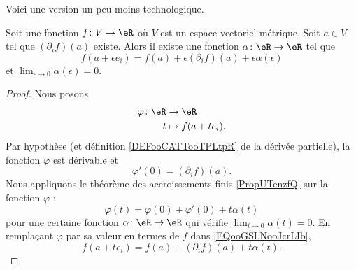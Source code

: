 Voici une version un peu moins technologique.
\begin{proposition}     \label{PROPooYYSMooUDxtlB}
	Soit une fonction \( f\colon V\to \eR\) où \( V\) est un espace vectoriel métrique. Soit \( a\in V\) tel que \( (\partial_if)(a)\) existe. Alors il existe une fonction \( \alpha\colon \eR\to \eR\) tel que
	\begin{equation}
		f(a+\epsilon e_i)=f(a)+\epsilon(\partial_if)(a)+\epsilon\alpha(\epsilon)
	\end{equation}
	et \( \lim_{\epsilon\to 0}\alpha(\epsilon)=0\).
\end{proposition}

\begin{proof}
	Nous posons
	\begin{equation}
		\begin{aligned}
			\varphi\colon \eR & \to \eR             \\
			t                 & \mapsto f(a+ te_i).
		\end{aligned}
	\end{equation}
	Par hypothèse (et définition \ref{DEFooCATTooTPLtpR} de la dérivée partielle), la fonction \( \varphi\) est dérivable et
	\begin{equation}
		\varphi'(0)=(\partial_if)(a).
	\end{equation}
	Nous appliquons le théorème des accroissements finis \ref{PropUTenzfQ} sur la fonction \( \varphi\) :
	\begin{equation}        \label{EQooGSLNooJcrLIb}
		\varphi(t)=\varphi(0)+\varphi'(0)+t\alpha(t)
	\end{equation}
	pour une certaine fonction \( \alpha\colon \eR\to \eR\) qui vérifie \( \lim_{t\to 0} \alpha(t)=0\). En remplaçant \( \varphi\) par sa valeur en termes de \( f\) dans \eqref{EQooGSLNooJcrLIb},
	\begin{equation}
		f(a+te_i)=f(a)+(\partial_if)(a)+t\alpha(t).
	\end{equation}
\end{proof}
